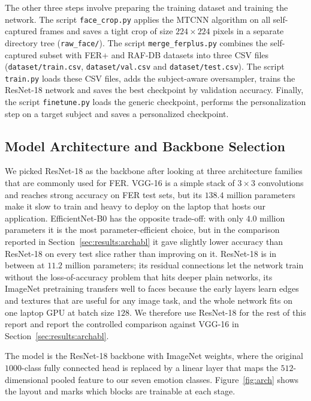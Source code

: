 The other three steps involve preparing the training dataset and training the network. The script \texttt{face\_crop.py} applies the MTCNN algorithm on all self-captured frames and saves a tight crop of size $224 \times 224$ pixels in a separate directory tree (\texttt{raw\_face/}). The script \texttt{merge\_ferplus.py} combines the self-captured subset with FER+ and RAF-DB datasets into three CSV files (\texttt{dataset/train.csv}, \texttt{dataset/val.csv} and \texttt{dataset/test.csv}). The script \texttt{train.py} loads these CSV files, adds the subject-aware oversampler, trains the ResNet-18 network and saves the best checkpoint by validation accuracy. Finally, the script \texttt{finetune.py} loads the generic checkpoint, performs the personalization step on a target subject and saves a personalized checkpoint.

\subsection{Model Architecture and Backbone Selection}
\label{sec:impl:arch}

We picked ResNet-18 \autocite{he2016resnet} as the backbone after looking at three architecture families that are commonly used for FER. VGG-16 \autocite{simonyan2015vgg} is a simple stack of $3\times 3$ convolutions and reaches strong accuracy on FER test sets, but its $138.4$ million parameters make it slow to train and heavy to deploy on the laptop that hosts our application. EfficientNet-B0 \autocite{tan2019efficientnet} has the opposite trade-off: with only $4.0$ million parameters it is the most parameter-efficient choice, but in the comparison reported in Section~\ref{sec:results:archabl} it gave slightly lower accuracy than ResNet-18 on every test slice rather than improving on it. ResNet-18 is in between at $11.2$ million parameters; its residual connections \autocite{he2016resnet} let the network train without the loss-of-accuracy problem that hits deeper plain networks, its ImageNet pretraining transfers well to faces because the early layers learn edges and textures that are useful for any image task, and the whole network fits on one laptop GPU at batch size $128$. We therefore use ResNet-18 for the rest of this report and report the controlled comparison against VGG-16 in Section~\ref{sec:results:archabl}.

The model is the ResNet-18 backbone with ImageNet weights, where the original $1000$-class fully connected head is replaced by a linear layer that maps the $512$-dimensional pooled feature to our seven emotion classes. Figure~\ref{fig:arch} shows the layout and marks which blocks are trainable at each stage.

